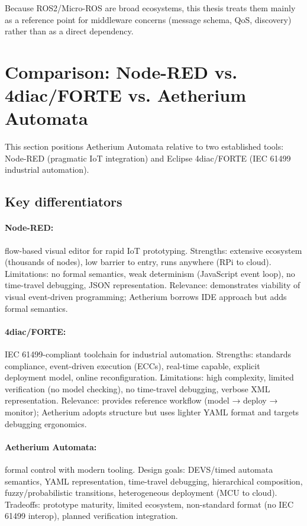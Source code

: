 Because ROS2/Micro-ROS are broad ecosystems, this thesis treats them mainly as a reference point for middleware concerns (message schema, QoS, discovery) rather than as a direct dependency.

\section{Comparison: Node-RED vs. 4diac/FORTE vs. Aetherium Automata}

This section positions Aetherium Automata relative to two established tools: Node-RED (pragmatic IoT integration) and Eclipse 4diac/FORTE (IEC 61499 industrial automation).

\subsection{Key differentiators}

\paragraph{Node-RED:} flow-based visual editor for rapid IoT prototyping.
Strengths: extensive ecosystem (thousands of nodes), low barrier to entry, runs anywhere (RPi to cloud).
Limitations: no formal semantics, weak determinism (JavaScript event loop), no time-travel debugging, JSON representation.
Relevance: demonstrates viability of visual event-driven programming; Aetherium borrows IDE approach but adds formal semantics.

\paragraph{4diac/FORTE:} IEC 61499-compliant toolchain for industrial automation.
Strengths: standards compliance, event-driven execution (ECCs), real-time capable, explicit deployment model, online reconfiguration.
Limitations: high complexity, limited verification (no model checking), no time-travel debugging, verbose XML representation.
Relevance: provides reference workflow (model → deploy → monitor); Aetherium adopts structure but uses lighter YAML format and targets debugging ergonomics.

\paragraph{Aetherium Automata:} formal control with modern tooling.
Design goals: DEVS/timed automata semantics, YAML representation, time-travel debugging, hierarchical composition, fuzzy/probabilistic transitions, heterogeneous deployment (MCU to cloud).
Tradeoffs: prototype maturity, limited ecosystem, non-standard format (no IEC 61499 interop), planned verification integration.

